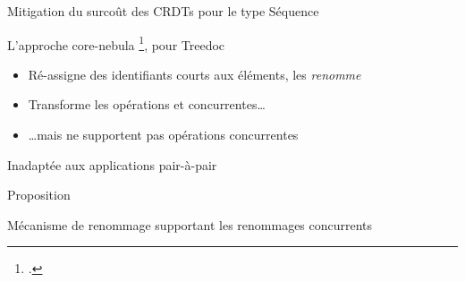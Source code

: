\begin{frame}{Mitigation du surcoût des CRDTs pour le type Séquence}
    \begin{block}{L'approche core-nebula \footcite{zawirski:hal-01248197}, pour Treedoc}
        \begin{itemize}
            \item Ré-assigne des identifiants courts aux éléments, \ie les \emph{renomme}
            \item Transforme les opérations \ins et \rmv concurrentes\dots
            \pause
            \item \dots mais ne supportent pas opérations \ren concurrentes
        \end{itemize}
    \end{block}
    \pause
    \begin{center}
        \alert{Inadaptée aux applications pair-à-pair}
    \end{center}
\end{frame}

\begin{frame}[standout]
    \alert{Proposition}

    Mécanisme de renommage supportant les renommages concurrents
\end{frame}
